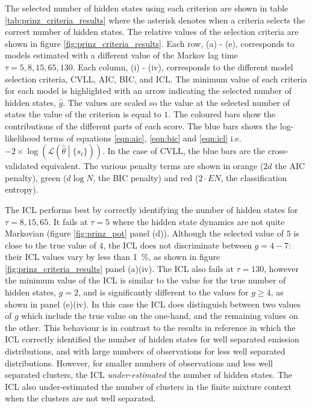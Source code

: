 The selected number of hidden states using each criterion are shown in table \ref{tab:prinz_criteria_results} where the asterisk denotes when a criteria selects the correct number of hidden states. The relative values of the selection criteria are shown in figure \ref{fig:prinz_criteria_results}. Each row, (a) - (e), corresponds to models estimated with a  different value of the Markov lag time $\tau=5, 8, 15, 65, 130$. Each column, (i) - (iv), corresponds to the different model selection criteria, CVLL, AIC, BIC, and ICL. The minimum value of each criteria for each model is highlighted with an arrow indicating the selected number of hidden states, $\hat{g}$. The values are scaled so the value at the selected number of states the value of the criterion is equal to $1$.  The coloured bars show the contributions of the different parts of each score. The blue bars shows the log-likelihood terms of equations \ref{eqn:aic}, \ref{eqn:bic} and \ref{eqn:icl} i.e.  $-2\times \log{\left(\mathcal{L}\left(\hat{\theta}\middle |\{s_t\}\right)\right)}$. In the case of CVLL, the blue bars are the  cross-validated equivalent. The various penalty terms are shown in orange ($2d$ the AIC penalty), green ($d\log{N}$, the BIC penalty) and red ($2\cdot EN$, the classification entropy). 

The ICL performs best by correctly identifying the number of hidden states for $\tau=8, 15, 65$. It fails at $\tau=5$ where the hidden state dynamics are not quite Markovian (figure \ref{fig:prinz_pot} panel (d)). Although the selected value of $5$ is close to the true value of $4$, the ICL does not discriminate between $g=4 - 7$: their ICL values vary by less than \SI{1}{\percent}, as shown in figure \ref{fig:prinz_criteria_results} panel (a)(iv). The ICL also fails at $\tau=130$, however the minimum value of the ICL is similar to the value for the true number of hidden states, $g = 2$, and is significantly different to the values for $g \ge 4$,  as shown in panel (e)(iv). In this case the ICL does distinguish between two values of $g$ which include the true value on the one-hand, and the remaining values on the other. This behaviour is in contrast to the results in reference \cite{celeuxSelectingHiddenMarkov2008} in which the ICL correctly identified the number of hidden states for well separated emission distributions, and with large numbers of observations for less well separated distributions. However, for smaller numbers of observations and less well separated clusters, the ICL \emph{under-estimated} the number of hidden states. The ICL also under-estimated the number of clusters in the finite mixture context when the clusters are not well separated\cite{biernackiAssessingMixtureModel2000a}. 

